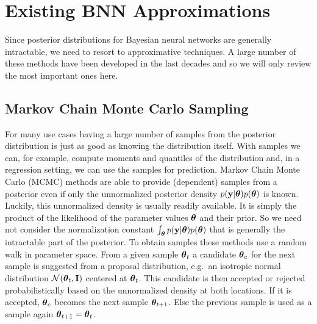 \documentclass[../thesis.tex]{subfiles}
\begin{document}
\section{Existing BNN Approximations}

Since posterior distributions for Bayesian neural networks are generally intractable, we need to resort to approximative techniques. A large number of these methods have been developed in the last decades and so we will only review the most important ones here.

\subsection{Markov Chain Monte Carlo Sampling}
For many use cases having a large number of samples from the posterior distribution is just as good as knowing the distribution itself. With samples we can, for example, compute moments and quantiles of the distribution and, in a regression setting, we can use the samples for prediction. Markov Chain Monte Carlo (MCMC) methods are able to provide (dependent) samples from a posterior even if only the unnormalized posterior density $p(\boldsymbol{\mathbf{y}}|\boldsymbol{\mathbf{\theta}})p(\boldsymbol{\mathbf{\theta}})$ is known. Luckily, this unnormalized density is usually readily available. It is simply the product of the likelihood of the parameter values $\boldsymbol{\mathbf{\theta}}$ and their prior. So we need not consider the normalization constant $\int_{\boldsymbol{\mathbf{\theta}}} p(\boldsymbol{\mathbf{y}}|\boldsymbol{\mathbf{\theta}})p(\boldsymbol{\mathbf{\theta}})$ that is generally the intractable part of the posterior. To obtain samples these methods use a random walk in parameter space. From a given sample $\boldsymbol{\mathbf{\theta}}_t$ a candidate $\boldsymbol{\mathbf{\theta}}_{c}$ for the next sample is suggested from a proposal distribution, e.g.\ an isotropic normal distribution $\mathcal{N}(\boldsymbol{\mathbf{\theta}}_t, \boldsymbol{\mathbf{I}})$ centered at $\boldsymbol{\mathbf{\theta}}_t$. This candidate is then accepted or rejected probabilistically based on the unnormalized density at both locations. If it is accepted, $\boldsymbol{\mathbf{\theta}}_c$ becomes the next sample $\boldsymbol{\mathbf{\theta}}_{t+1}$. Else the previous sample is used as a sample again $\boldsymbol{\mathbf{\theta}}_{t+1} = \boldsymbol{\mathbf{\theta}}_t$.
\end{document}
